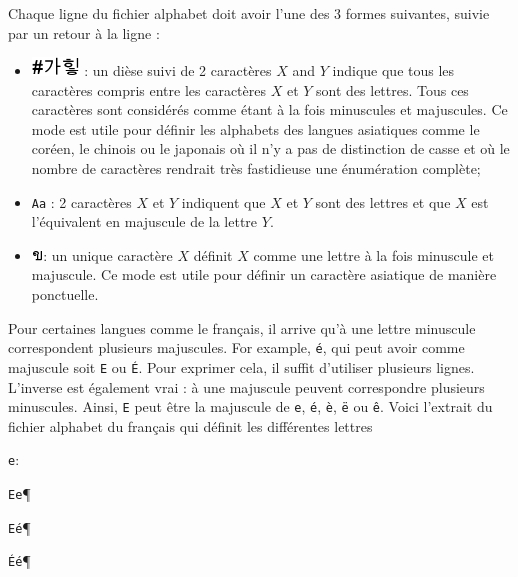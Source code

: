 \bigskip
\noindent Chaque ligne du fichier alphabet doit avoir l’une des 3 formes suivantes, suivie par un retour à la ligne :


\begin{itemize}
\item \includegraphics[height=0.5cm]{resources/img/korean_letters.png} : un dièse suivi de 2
	caractères $X$ and $Y$ indique que tous les caractères compris entre les caractères $X$ et
	$Y$ sont des lettres. Tous ces caractères sont considérés comme étant à la fois minuscules
	et majuscules. Ce mode est utile pour définir les alphabets des langues asiatiques comme le
	coréen, le chinois ou le japonais où il n’y a pas de distinction de casse et où le nombre de
	caractères rendrait très fastidieuse une énumération complète;


\item \verb+Aa+ : 2 caractères  $X$ et $Y$ indiquent que  $X$ et $Y$ sont des lettres et que  $X$                           est l’équivalent en majuscule de la lettre $Y$.

  \item \includegraphics[height=0.3cm]{resources/img/thai_letter.png}: un unique caractère $X$
  	  définit $X$ comme une lettre à la fois minuscule et majuscule. Ce mode est utile pour
  	  définir un caractère asiatique de manière ponctuelle.

\end{itemize}

\bigskip
\noindent Pour certaines langues comme le français, il arrive qu’à une lettre minuscule
correspondent plusieurs majuscules. For example, \texttt{é}, qui peut avoir comme majuscule
soit \verb+E+ ou \texttt{\'E}. Pour exprimer cela, il suffit d’utiliser plusieurs lignes.
L’inverse est également vrai : à une majuscule peuvent correspondre plusieurs minuscules. Ainsi,
\verb+E+ peut être la majuscule de \verb+e+, \texttt{é}, \texttt{è}, \texttt{ë} ou \texttt{ê}. Voici l’extrait du fichier alphabet du français qui définit les différentes lettres 

\verb+e+:

\bigskip
\noindent
\texttt{Ee}\P

\noindent
\texttt{Eé}\P

\noindent
\texttt{\'Eé}\P

